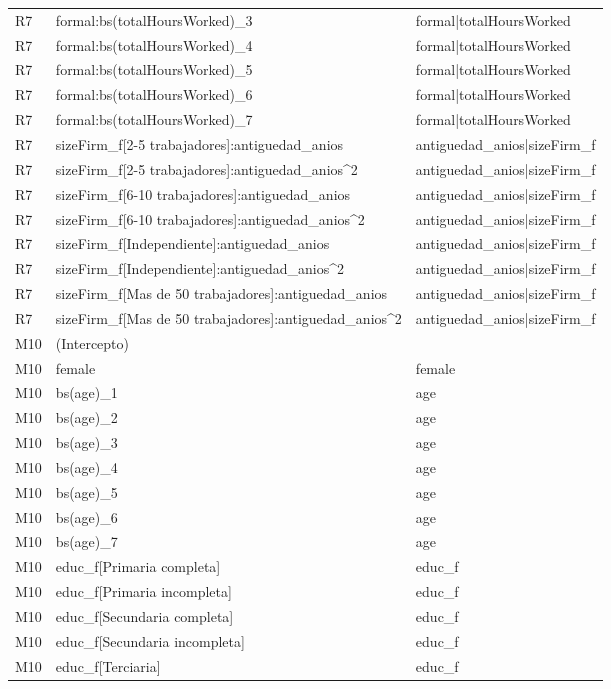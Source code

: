 \begin{longtable}{lll}
R7 & formal:bs(totalHoursWorked)\_3 & formal|totalHoursWorked \\
R7 & formal:bs(totalHoursWorked)\_4 & formal|totalHoursWorked \\
R7 & formal:bs(totalHoursWorked)\_5 & formal|totalHoursWorked \\
R7 & formal:bs(totalHoursWorked)\_6 & formal|totalHoursWorked \\
R7 & formal:bs(totalHoursWorked)\_7 & formal|totalHoursWorked \\
R7 & sizeFirm\_f[2-5 trabajadores]:antiguedad\_anios & antiguedad\_anios|sizeFirm\_f \\
R7 & sizeFirm\_f[2-5 trabajadores]:antiguedad\_anios\textasciicircum 2 & antiguedad\_anios|sizeFirm\_f \\
R7 & sizeFirm\_f[6-10 trabajadores]:antiguedad\_anios & antiguedad\_anios|sizeFirm\_f \\
R7 & sizeFirm\_f[6-10 trabajadores]:antiguedad\_anios\textasciicircum 2 & antiguedad\_anios|sizeFirm\_f \\
R7 & sizeFirm\_f[Independiente]:antiguedad\_anios & antiguedad\_anios|sizeFirm\_f \\
R7 & sizeFirm\_f[Independiente]:antiguedad\_anios\textasciicircum 2 & antiguedad\_anios|sizeFirm\_f \\
R7 & sizeFirm\_f[Mas de 50 trabajadores]:antiguedad\_anios & antiguedad\_anios|sizeFirm\_f \\
R7 & sizeFirm\_f[Mas de 50 trabajadores]:antiguedad\_anios\textasciicircum 2 & antiguedad\_anios|sizeFirm\_f \\
M10 & (Intercepto) &  \\
M10 & female & female \\
M10 & bs(age)\_1 & age \\
M10 & bs(age)\_2 & age \\
M10 & bs(age)\_3 & age \\
M10 & bs(age)\_4 & age \\
M10 & bs(age)\_5 & age \\
M10 & bs(age)\_6 & age \\
M10 & bs(age)\_7 & age \\
M10 & educ\_f[Primaria completa] & educ\_f \\
M10 & educ\_f[Primaria incompleta] & educ\_f \\
M10 & educ\_f[Secundaria completa] & educ\_f \\
M10 & educ\_f[Secundaria incompleta] & educ\_f \\
M10 & educ\_f[Terciaria] & educ\_f \\

\end{longtable}
